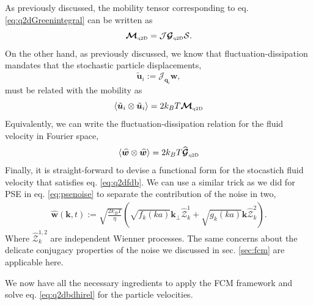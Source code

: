 \documentclass[ twoside,openright,titlepage,numbers=noenddot,%
headinclude,footinclude,cleardoublepage=empty,abstract=on,
BCOR=5mm,paper=a4,fontsize=11pt, dvipsnames
]{scrreprt}
\renewcommand{\vec}[1]{\bm{#1}}
\newcommand{\tens}[1]{\bm{\mathcal{#1}}}
\newcommand{\oper}[1]{\mathcal{#1}}
\newcommand{\kT}{k_B T}
\newcommand{\half}{\frac{1}{2}}
\newcommand{\fou}[1]{\widehat{#1}}
\newcommand{\ppos}{q}
\newcommand{\pvel}{u}
\newcommand{\qtd}{\text{\tiny q2D}}
\begin{document}
As previously discussed, the mobility tensor corresponding to eq. \eqref{eq:q2dGreenintegral} can be written as
\begin{equation}
  \tens{M}_{\qtd} = \oper{J}\tens{G}_{\qtd}\oper{S}.
\end{equation}
On the other hand, as previously discussed, we know that fluctuation-dissipation mandates that the stochastic particle displacements,
\begin{equation}
\tilde{\vec{\pvel}}_i := \oper{J}_{\vec{\ppos}_i}\vec{w},
\end{equation}
must be related with the mobility as
\begin{equation}
  \langle\tilde{\vec{\pvel}}_i\otimes\tilde{\vec{\pvel}}_i\rangle = 2\kT \tens{M}_{\qtd}
\end{equation}
Equivalently, we can write the fluctuation-dissipation relation for the fluid velocity in Fourier space,
\begin{equation}
  \label{eq:q2dfdb}
  \left\langle\fou{\vec{w}}\otimes \fou{\vec{w}}\right\rangle = 2\kT \fou{\tens{G}}_{\qtd}
\end{equation}
Finally, it is straight-forward to devise a functional form for the stocastich fluid velocity that satisfies eq. \eqref{eq:q2dfdb}.
We can use a similar trick as we did for \gls{PSE} in eq. \eqref{eq:psenoise} to separate the contribution of the noise in two,
\begin{equation}
  \begin{aligned}
    \fou{\vec{w}}(\vec{k}, t) := \sqrt{\frac{2\kT}{\eta}}\left(\sqrt{f_k(ka)}\vec{k}_\perp\fou{\tens{Z}}^1_k + \sqrt{g_k(ka)}\vec{k}\fou{\tens{Z}}^2_k\right).
  \end{aligned}
\end{equation}
Where $\fou{\tens{Z}}^{1,2}_k$ are independent Wienner processes. The same concerns about the delicate conjugacy properties of the noise we discussed in sec. \ref{sec:fcm} are applicable here.

We now have all the necessary ingredients to apply the \gls{FCM} framework and solve eq. \eqref{eq:q2dbdhirel} for the particle velocities.
\end{document}
